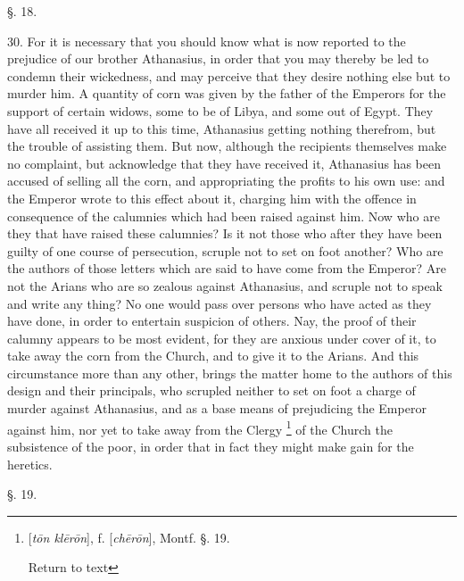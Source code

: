 §. 18.

30. For it is necessary that you should know what
is now reported to the prejudice of our brother Athanasius, in order
that you may thereby be led to condemn their wickedness, and may
perceive that they desire nothing else but to murder him. A quantity
of corn was given by the father of the Emperors for the support of
certain widows, some to be of Libya, and some out of Egypt. They have
all received it up to this time, Athanasius getting nothing therefrom,
but the trouble of assisting them. But now, although the recipients
themselves make no complaint, but acknowledge that they have received
it, Athanasius has been accused of selling all the corn, and
appropriating the profits to his own use: and the Emperor wrote to
this effect about it, charging him with the offence in consequence of
the calumnies which had been raised against him. Now who are they that
have raised these calumnies? Is it not those who after they have been
guilty of one course of persecution, scruple not to set on foot
another? Who are the authors of those letters which are said to have
come from the Emperor? Are not the Arians who are so zealous against
Athanasius, and scruple not to speak and write any thing? No one would
pass over persons who have acted as they have done, in order to
entertain suspicion of others. Nay, the proof of their calumny appears
to be most evident, for they are anxious under cover of it, to take
away the corn from the Church, and to give it to the Arians. And this
circumstance more than any other, brings the matter home to the
authors of this design and their principals, who scrupled neither to
set on foot a charge of murder against Athanasius, and as a base means
of prejudicing the Emperor against him, nor yet to take away from
the Clergy \footnote{[\emph{t\={o}n kl\={e}r\={o}n}], f. [\emph{ch\={e}r\={o}n}],
Montf. §. 19.

Return to text} of the
Church the subsistence of the poor, in order that in fact they might
make gain for the heretics.

§. 19.

